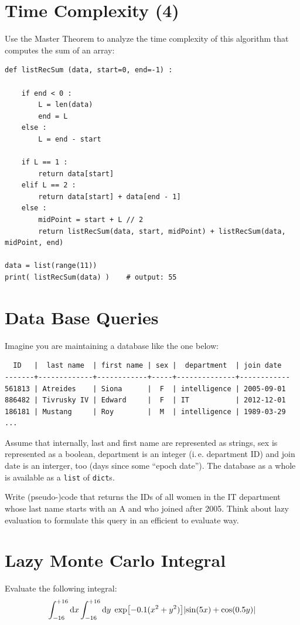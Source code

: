 \documentclass[
	english,
	fontsize=10pt,
	parskip=half,
	titlepage=true,
	DIV=12
]{scrartcl}
\newcommand*{\inPy}[1]{\texttt{#1}}
\newcommand*{\ie}{i.\,e.\xspace}
\begin{document}
\section{Time Complexity (4)}
Use the Master Theorem to analyze the time complexity of this algorithm that computes the sum of an array:
\begin{verbatim}
def listRecSum (data, start=0, end=-1) :
    
    if end < 0 : 
        L = len(data)
        end = L
    else :
        L = end - start
    
    if L == 1 :
        return data[start]
    elif L == 2 :
        return data[start] + data[end - 1]
    else :
        midPoint = start + L // 2
        return listRecSum(data, start, midPoint) + listRecSum(data, midPoint, end)

data = list(range(11))
print( listRecSum(data) )    # output: 55
\end{verbatim}

\section{Data Base Queries}
Imagine you are maintaining a database like the one below:
\begin{verbatim}
  ID   |  last name  | first name | sex |  department  | join date
-------+-------------+------------+-----+--------------+------------
561813 | Atreides    | Siona      |  F  | intelligence | 2005-09-01
886482 | Tivrusky IV | Edward     |  F  | IT           | 2012-12-01
186181 | Mustang     | Roy        |  M  | intelligence | 1989-03-29
...
\end{verbatim}

Assume that internally, last and first name are represented as strings, sex is represented as a boolean, department is an integer (\ie department ID) and join date is an interger, too (days since some \enquote{epoch date}). The database as a whole is available as a \inPy{list} of \inPy{dict}s.

Write (pseudo-)code that returns the IDs of all women in the IT department whose last name starts with an A and who joined after 2005. Think about lazy evaluation to formulate this query in an efficient to evaluate way.

\section{Lazy Monte Carlo Integral}
Evaluate the following integral:
\[
	\int_{-16}^{+16} \dd{x}
	\int_{-16}^{+16} \dd{y} \;
		\exp[-0.1 (x^2 + y^2)]
		\qty|
			\sin(5 x) + \cos(0.5 y)
		|
\]
\end{document}
